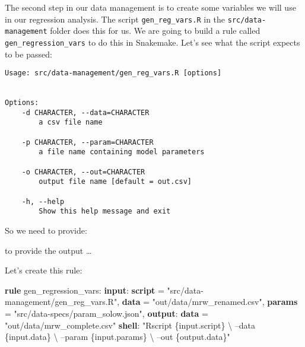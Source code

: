 \documentclass[]{book}
\newenvironment{Shaded}{\begin{snugshade}}{\end{snugshade}}
\newcommand{\KeywordTok}[1]{\textcolor[rgb]{0.13,0.29,0.53}{\textbf{{#1}}}}
\newcommand{\StringTok}[1]{\textcolor[rgb]{0.31,0.60,0.02}{{#1}}}
\newcommand{\NormalTok}[1]{{#1}}
\theoremstyle{definition}
\theoremstyle{definition}
\theoremstyle{definition}
\theoremstyle{remark}
\begin{document}
The second step in our data management is to create some variables we
will use in our regression analysis. The script
\texttt{gen\_reg\_vars.R} in the \texttt{src/data-management} folder
does this for us. We are going to build a rule called
\texttt{gen\_regression\_vars} to do this in Snakemake. Let's see what
the script expects to be passed:

\begin{Shaded}
\end{Shaded}

\begin{verbatim}
Usage: src/data-management/gen_reg_vars.R [options]


Options:
    -d CHARACTER, --data=CHARACTER
        a csv file name

    -p CHARACTER, --param=CHARACTER
        a file name containing model parameters

    -o CHARACTER, --out=CHARACTER
        output file name [default = out.csv]

    -h, --help
        Show this help message and exit
\end{verbatim}

So we need to provide:

to provide the output \ldots{}

Let's create this rule:

\begin{Shaded}
\begin{Highlighting}[]
\KeywordTok{rule} \NormalTok{gen_regression_vars:}
    \KeywordTok{input}\NormalTok{:}
        \KeywordTok{script} \NormalTok{= }\StringTok{"src/data-management/gen_reg_vars.R"}\NormalTok{,}
        \KeywordTok{data}   \NormalTok{= }\StringTok{"out/data/mrw_renamed.csv"}\NormalTok{,}
        \KeywordTok{params} \NormalTok{= }\StringTok{"src/data-specs/param_solow.json"}\NormalTok{,}
    \KeywordTok{output}\NormalTok{:}
        \KeywordTok{data} \NormalTok{= }\StringTok{"out/data/mrw_complete.csv"}
    \KeywordTok{shell}\NormalTok{:}
        \StringTok{"Rscript \{input.script\} \textbackslash{}}
\StringTok{            --data \{input.data\} \textbackslash{}}
\StringTok{            --param \{input.params\} \textbackslash{}}
\StringTok{            --out \{output.data\}"}
\end{Highlighting}
\end{Shaded}
\end{document}
